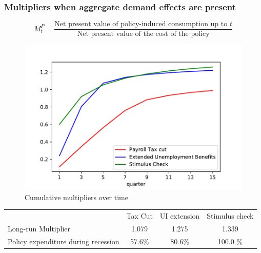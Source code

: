 \documentclass[pdflatex]{beamer}
\begin{document}
\begin{frame}
\frametitle{Multipliers when aggregate demand effects are present}


\begin{equation*}
M^P_t = \frac{\text{Net present value of policy-induced consumption up to $t$}}{\text{Net present value of the cost of the policy}}
\end{equation*}

\begin{figure}[t]
	\centering
	\includegraphics[width=0.6\linewidth]{Code/HA-Models/FromPandemicCode/Figures/Cummulative_multipliers}
	\caption{Cumulative multipliers over time}
\end{figure}

\begin{table}
	\footnotesize
	\begin{tabular}{@{}lccc@{}} 
		& Tax Cut    & UI extension    & Stimulus check    \\ 
		Long-run Multiplier  &1.079  & 1.275  & 1.339     \\ 
		Policy expenditure during recession  &57.6\%  & 80.6\%  & 100.0 \%    \\ 
	\end{tabular}  
\end{table}

\end{frame}
\end{document}
